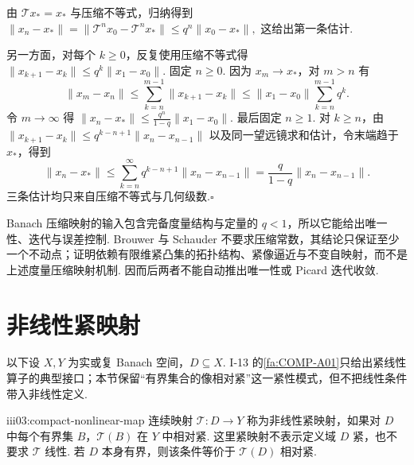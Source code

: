 \begin{FAProof}
由 \(\displaystyle \mathcal T x_*=x_*\) 与压缩不等式，归纳得到
\(\displaystyle \|x_n-x_*\| = \|\mathcal T^n x_0-\mathcal T^n x_*\| \leqslant q^n\|x_0-x_*\|,\)
这给出第一条估计.

另一方面，对每个 \(\displaystyle k\geqslant0\)，反复使用压缩不等式得
\(\displaystyle \|x_{k+1}-x_k\| \leqslant q^k\|x_1-x_0\|.\)
固定 \(\displaystyle n\geqslant0\). 因为 \(\displaystyle x_m\to x_*\)，对 \(\displaystyle m>n\) 有
\[
\|x_m-x_n\|
\leqslant
\sum_{k=n}^{m-1}\|x_{k+1}-x_k\|
\leqslant
\|x_1-x_0\|\sum_{k=n}^{m-1}q^k.
\]
令 \(\displaystyle m\to\infty\) 得
\(\displaystyle \|x_n-x_*\| \leqslant \frac{q^n}{1-q}\|x_1-x_0\|.\)
最后固定 \(\displaystyle n\geqslant1\). 对 \(\displaystyle k\geqslant n\)，由
\(\displaystyle \|x_{k+1}-x_k\| \leqslant q^{k-n+1}\|x_n-x_{n-1}\|\)
以及同一望远镜求和估计，令末端趋于 \(\displaystyle x_*\)，得到
\[
\|x_n-x_*\|
\leqslant
\sum_{k=n}^{\infty}q^{k-n+1}\|x_n-x_{n-1}\|
=
\frac{q}{1-q}\|x_n-x_{n-1}\|.
\]
三条估计均只来自压缩不等式与几何级数.\hfill\(\square\)

\end{FAProof}

\begin{FARemark}[度量不动点与拓扑不动点的分界]
Banach 压缩映射的输入包含完备度量结构与定量的 \(\displaystyle q<1\)，所以它能给出唯一性、迭代与误差控制. Brouwer 与 Schauder 不要求压缩常数，其结论只保证至少一个不动点；证明依赖有限维紧凸集的拓扑结构、紧像逼近与不变自映射，而不是上述度量压缩映射机制. 因而后两者不能自动推出唯一性或 Picard 迭代收敛.
\end{FARemark}

\section{非线性紧映射}\label{sec:iii03-compact-maps}

以下设 \(\displaystyle X,Y\) 为实或复 Banach 空间，\(\displaystyle D\subseteq X\). I-13 的\autoref{fa:COMP-A01}只给出紧线性算子的典型接口；本节保留“有界集合的像相对紧”这一紧性模式，但不把线性条件带入非线性定义.

\begin{FADefinition}[B][非线性紧映射]{iii03:compact-nonlinear-map}
连续映射 \(\displaystyle \mathcal T:D\to Y\) 称为非线性紧映射，如果对 \(\displaystyle D\) 中每个有界集 \(\displaystyle B\)，\(\displaystyle \mathcal T(B)\) 在 \(\displaystyle Y\) 中相对紧. 这里紧映射不表示定义域 \(\displaystyle D\) 紧，也不要求 \(\displaystyle \mathcal T\) 线性. 若 \(\displaystyle D\) 本身有界，则该条件等价于 \(\displaystyle \mathcal T(D)\) 相对紧.
\end{FADefinition}

